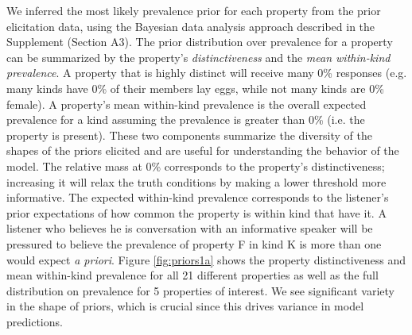 \documentclass[10pt,letterpaper]{article}
\newcommand{\ndg}[1]{\textcolor{Green}{[ndg: #1]}}
\begin{document}
We inferred the most likely prevalence prior for each property from the prior elicitation data, using the Bayesian data analysis approach described in the Supplement (Section A3). %
The prior distribution over prevalence for a property can be summarized by the property's \emph{distinctiveness} and the \emph{mean within-kind prevalence}.
A property that is highly distinct will receive many 0\% responses (e.g. many kinds have 0\% of their members lay eggs, while not many kinds are 0\% female).
A property's mean within-kind prevalence is the overall expected prevalence for a kind assuming the prevalence is greater than 0\% (i.e. the property is present).
These two components summarize the diversity of the shapes of the priors elicited and are useful for understanding the behavior of the model.
The relative mass at 0\% corresponds to the property's distinctiveness; increasing it will relax the truth conditions by making a lower threshold more informative. 
The expected within-kind prevalence corresponds to the listener's prior expectations of how common the property is within kind that have it. 
A listener who believes he is conversation with an informative speaker will be pressured to believe the prevalence of property F in kind K is more than one would expect \emph{a priori}.
%
Figure \ref{fig:priors1a} shows the property distinctiveness and mean within-kind prevalence for all 21 different properties as well as the full distribution on prevalence for 5 properties of interest. 
We see significant variety in the shape of priors, which is crucial since this drives variance in model predictions.


\end{document}
